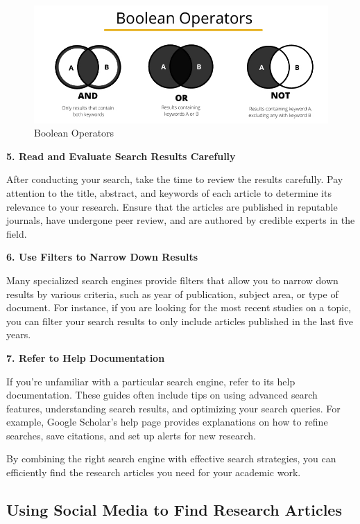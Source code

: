 \documentclass[
]{book}
\begin{document}
\begin{figure}
\centering
\includegraphics[width=1\textwidth,height=\textheight]{images/boolean.jpg}
\caption{Boolean Operators}
\end{figure}

\textbf{5. Read and Evaluate Search Results Carefully}

After conducting your search, take the time to review the results carefully. Pay attention to the title, abstract, and keywords of each article to determine its relevance to your research. Ensure that the articles are published in reputable journals, have undergone peer review, and are authored by credible experts in the field.

\textbf{6. Use Filters to Narrow Down Results}

Many specialized search engines provide filters that allow you to narrow down results by various criteria, such as year of publication, subject area, or type of document. For instance, if you are looking for the most recent studies on a topic, you can filter your search results to only include articles published in the last five years.

\textbf{7. Refer to Help Documentation}

If you're unfamiliar with a particular search engine, refer to its help documentation. These guides often include tips on using advanced search features, understanding search results, and optimizing your search queries. For example, Google Scholar's help page provides explanations on how to refine searches, save citations, and set up alerts for new research.

By combining the right search engine with effective search strategies, you can efficiently find the research articles you need for your academic work.

\subsection*{Using Social Media to Find Research Articles}\label{using-social-media-to-find-research-articles}
\end{document}
